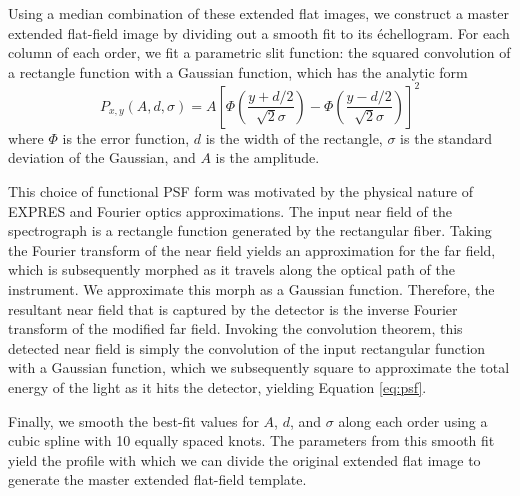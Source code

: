 Using a median combination of these extended flat images, we construct a master extended flat-field image by dividing out a smooth fit to its \'echellogram. For each column of each order, we fit a parametric slit function: the squared convolution of a rectangle function with a Gaussian function, which has the analytic form
\begin{equation}
    P_{x,y}(A,d,\sigma) = A \left[ \Phi \left( \frac{y+d/2}{\sqrt{2}\sigma} \right) - \Phi \left(\frac{y-d/2}{\sqrt{2}\sigma} \right) \right]^2
    \label{eq:psf}
\end{equation}
where $\Phi$ is the error function, $d$ is the width of the rectangle, $\sigma$ is the standard deviation of the Gaussian, and $A$ is the amplitude.

This choice of functional PSF form was motivated by the physical nature of EXPRES and Fourier optics approximations. The input near field of the spectrograph is a rectangle function generated by the rectangular fiber. Taking the Fourier transform of the near field yields an approximation for the far field, which is subsequently morphed as it travels along the optical path of the instrument. We approximate this morph as a Gaussian function. Therefore, the resultant near field that is captured by the detector is the inverse Fourier transform of the modified far field. Invoking the convolution theorem, this detected near field is simply the convolution of the input rectangular function with a Gaussian function, which we subsequently square to approximate the total energy of the light as it hits the detector, yielding Equation \ref{eq:psf}.

Finally, we smooth the best-fit values for $A$, $d$, and $\sigma$ along each order using a cubic spline with 10 equally spaced knots. The parameters from this smooth fit yield the profile with which we can divide the original extended flat image to generate the master extended flat-field template.

